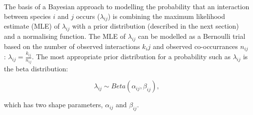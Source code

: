 \documentclass[12pt]{article}
\begin{document}
\begin{spacing}{2.0}

    The basis of a Bayesian approach to modelling the probability that an interaction between species $i$ and $j$ occurs ($\lambda_{ij}$) is combining the maximum likelihood estimate (MLE) of $\lambda_{ij}$ with a prior distribution (described in the next section) and a normalising function. The MLE of $\lambda_{ij}$ can be modelled as a Bernoulli trial based on the number of observed interactions $k_ij$ and observed co-occurrances $n_{ij}$: $\lambda_{ij} = \frac{k_{ij}}{n_{ij}}$. The most appropriate prior distribution for a probability such as $\lambda_{ij}$ is the beta distribution:

    \begin{equation}
          \lambda_{ij} \sim Beta(\alpha_{ij},\beta_{ij}) , \label{prior}
        \end{equation}

        \noindent which has two shape parameters, $\alpha_{ij}$ and $\beta_{ij}$. 


\end{spacing}
\end{document}

